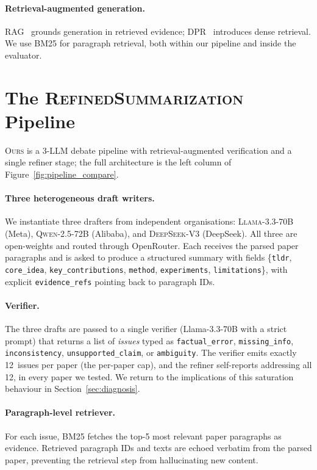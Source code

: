 \documentclass[11pt,a4paper]{article}
\begin{document}
\paragraph{Retrieval-augmented generation.}
RAG~\cite{lewis2020retrieval} grounds generation in retrieved evidence;
DPR~\cite{karpukhin2020dpr} introduces dense retrieval. We use BM25
\citep{robertson1995okapi} for paragraph retrieval, both within our
pipeline and inside the evaluator.

\section{The \textsc{RefinedSummarization} Pipeline}
\label{sec:method}

\textsc{Ours} is a 3-LLM debate pipeline with retrieval-augmented
verification and a single refiner stage; the full architecture is the
left column of Figure~\ref{fig:pipeline_compare}.

\paragraph{Three heterogeneous draft writers.}
We instantiate three drafters from independent organisations:
\textsc{Llama-3.3-70B} (Meta), \textsc{Qwen-2.5-72B} (Alibaba), and
\textsc{DeepSeek-V3} (DeepSeek). All three are open-weights and routed
through OpenRouter. Each receives the parsed paper paragraphs and is
asked to produce a structured summary with fields
\{\texttt{tldr}, \texttt{core\_idea}, \texttt{key\_contributions},
\texttt{method}, \texttt{experiments}, \texttt{limitations}\}, with
explicit \texttt{evidence\_refs} pointing back to paragraph IDs.

\paragraph{Verifier.}
The three drafts are passed to a single verifier (Llama-3.3-70B with a
strict prompt) that returns a list of \emph{issues} typed as
\texttt{factual\_error}, \texttt{missing\_info}, \texttt{inconsistency},
\texttt{unsupported\_claim}, or \texttt{ambiguity}. The verifier emits
exactly 12~issues per paper (the per-paper cap), and the refiner
self-reports addressing all 12, in every paper we tested. We return to
the implications of this saturation behaviour in
Section~\ref{sec:diagnosis}.

\paragraph{Paragraph-level retriever.}
For each issue, BM25 fetches the top-5 most relevant paper paragraphs
as evidence. Retrieved paragraph IDs and texts are echoed verbatim from
the parsed paper, preventing the retrieval step from hallucinating new
content.
\end{document}
